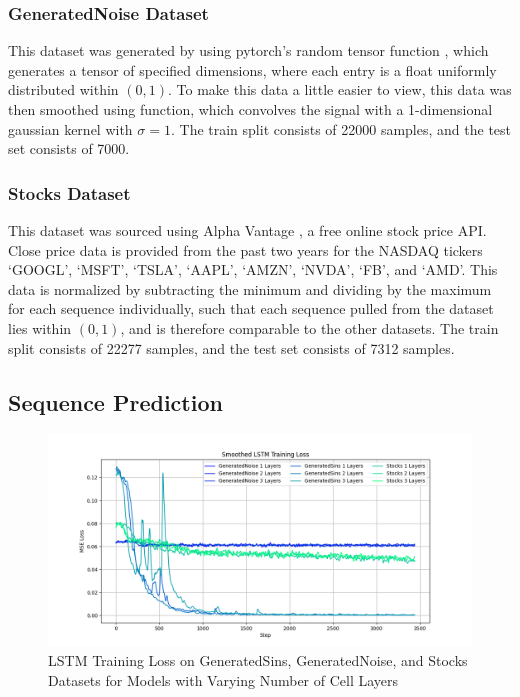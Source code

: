 \documentclass{scrartcl}
\begin{document}
\subsubsection{GeneratedNoise Dataset}
\label{subsubsec:generatednoise_intro}

This dataset was generated by using pytorch's random tensor function
, which generates a tensor of specified dimensions,
where each entry is a float uniformly distributed within $(0, 1)$. To make this
data a little easier to view, this data was then smoothed using
 function, which convolves
the signal with a 1-dimensional gaussian kernel with $\sigma = 1$. The train
split consists of 22000 samples, and the test set consists of 7000.

\subsubsection{Stocks Dataset}
\label{subsubsec:stocks_intro}

This dataset was sourced using Alpha Vantage \cite{alpha_vantage}, a free
online stock price API. Close price data is provided from the past two years
for the NASDAQ tickers `GOOGL', `MSFT', `TSLA', `AAPL', `AMZN', `NVDA', `FB',
and `AMD'. This data is normalized by subtracting the minimum and dividing by
the maximum for each sequence individually, such that each sequence pulled from
the dataset lies within $(0, 1)$, and is therefore comparable to the other
datasets. The train split consists of 22277 samples, and the test set consists
of 7312 samples.

\subsection{Sequence Prediction}
\label{subsec:experiment_sp}

\begin{figure}[H]
	\begin{center}
		\includegraphics[width=1\textwidth]{plots/lstm_train_loss.png}
	\end{center}
	\caption{LSTM Training Loss on GeneratedSins, GeneratedNoise, and Stocks
	Datasets for Models with Varying Number of Cell Layers}
	\label{plt:lstm_train_loss}
\end{figure}
\end{document}
